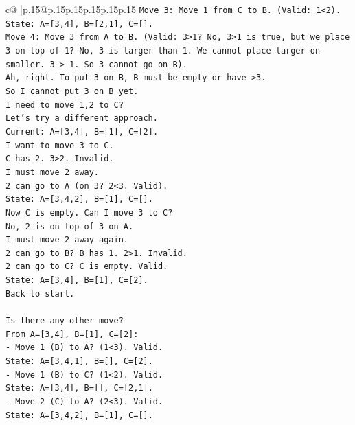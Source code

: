 \documentclass{article}
\begin{document}
{\begin{supertabular}{c@{$\;$}|p{.15\linewidth}@{}p{.15\linewidth}p{.15\linewidth}p{.15\linewidth}p{.15\linewidth}p{.15\linewidth}}
{{{\texttt{Move 3: Move 1 from C to B. (Valid: 1<2).} \\
\texttt{State: A={[}3,4{]}, B={[}2,1{]}, C={[}{]}.} \\
\texttt{Move 4: Move 3 from A to B. (Valid: 3>1? No, 3>1 is true, but we place 3 on top of 1? No, 3 is larger than 1. We cannot place larger on smaller. 3 > 1. So 3 cannot go on B).} \\
\texttt{Ah, right. To put 3 on B, B must be empty or have >3.} \\
\texttt{So I cannot put 3 on B yet.} \\
\texttt{I need to move 1,2 to C?} \\
\texttt{Let's try a different approach.} \\
\texttt{Current: A={[}3,4{]}, B={[}1{]}, C={[}2{]}.} \\
\texttt{I want to move 3 to C.} \\
\texttt{C has 2. 3>2. Invalid.} \\
\texttt{I must move 2 away.} \\
\texttt{2 can go to A (on 3? 2<3. Valid).} \\
\texttt{State: A={[}3,4,2{]}, B={[}1{]}, C={[}{]}.} \\
\texttt{Now C is empty. Can I move 3 to C?} \\
\texttt{No, 2 is on top of 3 on A.} \\
\texttt{I must move 2 away again.} \\
\texttt{2 can go to B? B has 1. 2>1. Invalid.} \\
\texttt{2 can go to C? C is empty. Valid.} \\
\texttt{State: A={[}3,4{]}, B={[}1{]}, C={[}2{]}.} \\
\texttt{Back to start.} \\
\\ 
\texttt{Is there any other move?} \\
\texttt{From A={[}3,4{]}, B={[}1{]}, C={[}2{]}:} \\
\texttt{{-} Move 1 (B) to A? (1<3). Valid.} \\
\texttt{State: A={[}3,4,1{]}, B={[}{]}, C={[}2{]}.} \\
\texttt{{-} Move 1 (B) to C? (1<2). Valid.} \\
\texttt{State: A={[}3,4{]}, B={[}{]}, C={[}2,1{]}.} \\
\texttt{{-} Move 2 (C) to A? (2<3). Valid.} \\
\texttt{State: A={[}3,4,2{]}, B={[}1{]}, C={[}{]}.} \\
}}}
\end{supertabular}}
\end{document}
